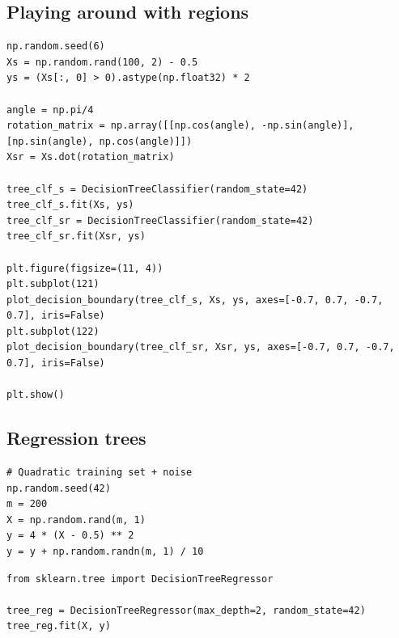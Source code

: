 \documentclass[%
oneside,                 %
final,                   %
10pt]{article}
\begin{document}
\subsection*{Playing around with regions}
\begin{verbatim}
np.random.seed(6)
Xs = np.random.rand(100, 2) - 0.5
ys = (Xs[:, 0] > 0).astype(np.float32) * 2

angle = np.pi/4
rotation_matrix = np.array([[np.cos(angle), -np.sin(angle)], [np.sin(angle), np.cos(angle)]])
Xsr = Xs.dot(rotation_matrix)

tree_clf_s = DecisionTreeClassifier(random_state=42)
tree_clf_s.fit(Xs, ys)
tree_clf_sr = DecisionTreeClassifier(random_state=42)
tree_clf_sr.fit(Xsr, ys)

plt.figure(figsize=(11, 4))
plt.subplot(121)
plot_decision_boundary(tree_clf_s, Xs, ys, axes=[-0.7, 0.7, -0.7, 0.7], iris=False)
plt.subplot(122)
plot_decision_boundary(tree_clf_sr, Xsr, ys, axes=[-0.7, 0.7, -0.7, 0.7], iris=False)

plt.show()
\end{verbatim}

\subsection*{Regression trees}
\begin{verbatim}
# Quadratic training set + noise
np.random.seed(42)
m = 200
X = np.random.rand(m, 1)
y = 4 * (X - 0.5) ** 2
y = y + np.random.randn(m, 1) / 10
\end{verbatim}

\begin{verbatim}
from sklearn.tree import DecisionTreeRegressor

tree_reg = DecisionTreeRegressor(max_depth=2, random_state=42)
tree_reg.fit(X, y)
\end{verbatim}

\end{document}
